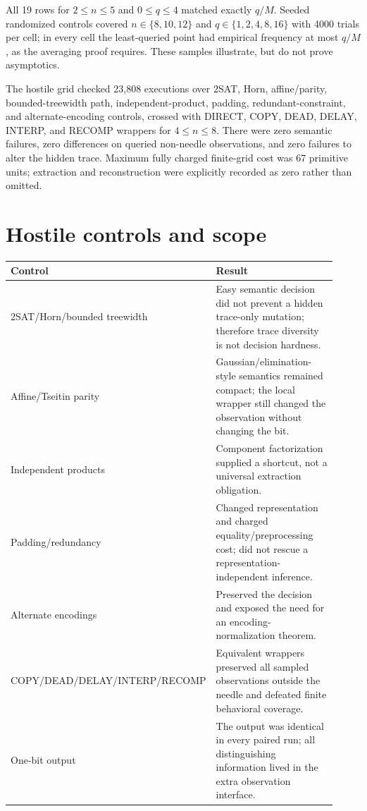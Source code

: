 \documentclass[11pt]{article}
\begin{document}
All 19 rows for $2\le n\le5$ and $0\le q\le4$ matched exactly $q/M$.  Seeded randomized controls covered $n\in\{8,10,12\}$ and $q\in\{1,2,4,8,16\}$ with 4000 trials per cell; in every cell the least-queried point had empirical frequency at most $q/M$, as the averaging proof requires.  These samples illustrate, but do not prove asymptotics.

The hostile grid checked 23,808 executions over 2SAT, Horn, affine/parity, bounded-treewidth path, independent-product, padding, redundant-constraint, and alternate-encoding controls, crossed with DIRECT, COPY, DEAD, DELAY, INTERP, and RECOMP wrappers for $4\le n\le8$.  There were zero semantic failures, zero differences on queried non-needle observations, and zero failures to alter the hidden trace.  Maximum fully charged finite-grid cost was 67 primitive units; extraction and reconstruction were explicitly recorded as zero rather than omitted.

\section{Hostile controls and scope}

\begin{center}
\begin{tabular}{p{0.24\linewidth}p{0.68\linewidth}}
\toprule
Control & Result\\
\midrule
2SAT/Horn/bounded treewidth & Easy semantic decision did not prevent a hidden trace-only mutation; therefore trace diversity is not decision hardness.\\
Affine/Tseitin parity & Gaussian/elimination-style semantics remained compact; the local wrapper still changed the observation without changing the bit.\\
Independent products & Component factorization supplied a shortcut, not a universal extraction obligation.\\
Padding/redundancy & Changed representation and charged equality/preprocessing cost; did not rescue a representation-independent inference.\\
Alternate encodings & Preserved the decision and exposed the need for an encoding-normalization theorem.\\
COPY/DEAD/DELAY/INTERP/RECOMP & Equivalent wrappers preserved all sampled observations outside the needle and defeated finite behavioral coverage.\\
One-bit output & The output was identical in every paired run; all distinguishing information lived in the extra observation interface.\\
\bottomrule
\end{tabular}
\end{center}
\end{document}
